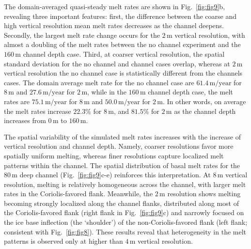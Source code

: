 \documentclass[draft]{agujournal2019}
\begin{document}
The domain-averaged quasi-steady melt rates are shown in Fig.~\ref{fig:fig9}b, revealing three important features: first, the difference between the coarse and high vertical resolution mean melt rates decreases as the channel deepens. Secondly, the largest melt rate change occurs for the $2\,\mathrm{m}$ vertical resolution, with almost a doubling of the melt rates between the no channel experiment and the $160\,\mathrm{m}$ channel depth case. Third, at coarser vertical resolution, the spatial standard deviation for the no channel and channel cases overlap, whereas at $2\,\mathrm{m}$ vertical resolution the no channel case is statistically different from the channels cases. The domain average melt rate for the no channel case are $61.4\,\mathrm{m/year}$ for $8\,\mathrm{m}$ and $27.6\,\mathrm{m/year}$ for $2\,\mathrm{m}$, while in the $160\,\mathrm{m}$ channel depth case, the melt rates are $75.1\,\mathrm{m/year}$ for $8\,\mathrm{m}$ and $50.0\,\mathrm{m/year}$ for $2\,\mathrm{m}$. In other words, on average the melt rates increase $22.3\%$ for $8\,\mathrm{m}$, and $81.5\%$ for $2\,\mathrm{m}$ as the channel depth increases from $0\,\mathrm{m}$ to $160\,\mathrm{m}$. 


 

The spatial variability of the simulated melt rates increases with the increase of vertical resolution and channel depth. Namely, coarser resolutions favor more spatially uniform melting, whereas finer resolutions capture localized melt patterns within the channel. The spatial distribution of basal melt rates for the $80\,\mathrm{m}$ deep channel (Fig.~\ref{fig:fig9}c-e) reinforces this interpretation. At $8\,\mathrm{m}$ vertical resolution, melting is relatively homogeneous across the channel, with larger melt rates in the Coriolis-favored flank. Meanwhile, the $2\,\mathrm{m}$ resolution shows melting becoming strongly localized along the channel flanks, distributed along most of the Coriolis-favored flank (right flank in Fig.~\ref{fig:fig9}c) and narrowly focused on the ice base inflection (the `shoulder') of the non-Coriolis-favored flank (left flank; consistent with Fig.~\ref{fig:fig8}). These results reveal that heterogeneity in the melt patterns is observed only at higher than $4\,\mathrm{m}$ vertical resolution.
\end{document}
